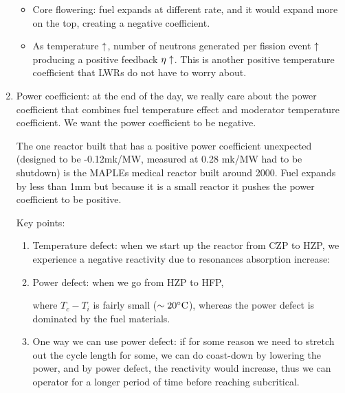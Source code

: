 \documentclass{school-22.211-notes}
\begin{document}
\begin{enumerate}
\begin{itemize}
\item Core flowering: fuel expands at different rate, and it would
  expand more on the top, creating a negative coefficient.

\item As temperature $\uparrow$, number of neutrons generated per fission
  event $\uparrow$ producing a positive feedback $\eta \uparrow$. This is
  another positive temperature coefficient that LWRs do not have to
  worry about.
\end{itemize}


\item Power coefficient: at the end of the day, we really care about
  the power coefficient that combines fuel temperature effect and
  moderator temperature coefficient. We want the power coefficient to
  be negative.


The one reactor built that has a positive power coefficient unexpected
(designed to be -0.12mk/MW, measured at 0.28 mk/MW had to be shutdown)
is the MAPLEs medical reactor built around 2000. Fuel expands by less
than 1mm but because it is a small reactor it pushes the power
coefficient to be positive.

Key points:
\begin{enumerate}
\item Temperature defect: when we start up the reactor from CZP to
  HZP, we experience a negative reactivity due to resonances
  absorption increase:


\item Power defect: when we go from HZP to HFP, 


  where $T_c - T_i$ is fairly small ($\sim 20^\circ\mathrm{C}$), whereas the
  power defect is dominated by the fuel materials.

\item One way we can use power defect: if for some reason we need to
  stretch out the cycle length for some, we can do coast-down by
  lowering the power, and by power defect, the reactivity would
  increase, thus we can operator for a longer period of time before
  reaching subcritical.


\end{enumerate}
\end{enumerate}
\end{document}
